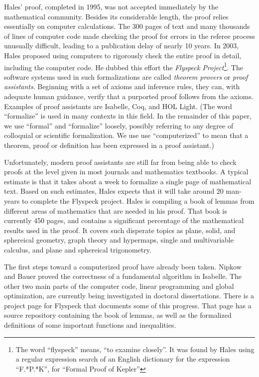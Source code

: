 Hales' proof, completed in 1995, was not accepted immediately by the
mathematical community.  Besides its considerable length, the proof
relies essentially on computer calculations.  The 300 pages of text
and many thousands of lines of computer code made checking the proof
for errors in the referee process unusually difficult, leading to a
publication delay of nearly 10 years.  In 2003, Hales proposed using
computers to rigorously check the entire proof in detail, including
the computer code.  He dubbed this effort the \textit{Flyspeck
  Project}\footnote{The word ``flyspeck'' means, ``to examine
  closely''.  It was found by Hales using a regular expression search
  of an English dictionary for the expression ``F.*P.*K'', for
  ``Formal Proof of Kepler''}.  The software systems used in such
formalizations are called \textit{theorem provers} or \textit{proof
  assistants}.  Beginning with a set of axioms and inference rules,
they can, with adequate human guidance, verify that a purported proof
follows from the axioms.  Examples of proof assistants are
Isabelle\cite{Paulson:1994:Isabelle}, Coq\cite{Bertot:2004:CoqBook},
and HOL Light\cite{Harrison:2000:HOL-Light}. (The word ``formalize'' is used
in many contexts in this field.  In the remainder of this paper, we
use ``formal'' and ``formalize'' loosely, possibly referring to 
any degree of colloquial or scientific formalization.  We use
use ``computerized'' to mean that a theorem, proof or definition has
been expressed in a proof assistant.)

  Unfortunately, modern proof assistants are still far from being able to check
proofs at the level given in most journals and mathematics textbooks.  A typical
estimate is that it takes about a week to formalize a single page of mathematical
text.  Based on such estimates, Hales expects that it will take 
around 20 man-years to complete the Flyspeck project.  
Hales is compiling a book\cite{Hales:2007:FlyspeckBook}
of lemmas from different areas of mathematics that are needed in his proof. 
That book is currently 450 pages, and contains a significant percentage
of the mathematical results used in the proof.  It covers such disperate topics
as plane, solid, and sphereical geometry, graph theory and hypermaps, single and
multivariable calculus, and plane and sphereical trigonometry.

The first steps toward a computerized proof have already been taken.
Nipkow and Bauer\cite{Nipkow:2005:Tame} proved the correctness of a
fundamental algorithm in Isabelle.  The other two main parts of the
computer code, linear programming and global optimization, are
currently being investigated in doctoral
dissertations\cite{Zumkeller:2006:TaylorModels,Obua:2005:LinearPrograms}.
There is a project page\cite{website:FlyspeckProjectPage} for Flyspeck
that documents some of this progress.  That page has a source
repository containing the book of lemmas, as well as the formalized
definitions of some important functions and inequalities.  

